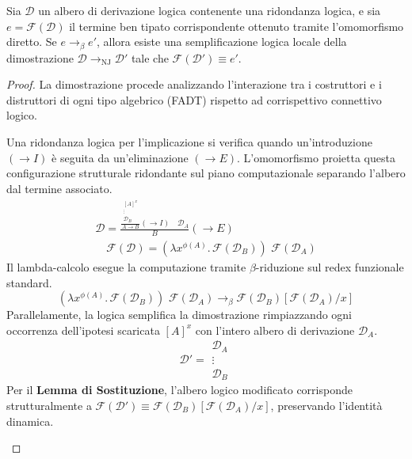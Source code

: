 \begin{thm}
    Sia $\mathcal{D}$ un albero di derivazione logica contenente una ridondanza logica, e sia $e = \mathcal{F}(\mathcal{D})$ il termine ben tipato corrispondente ottenuto 
    tramite l'omomorfismo diretto. Se $e \to_\beta e'$, allora esiste una semplificazione logica locale della dimostrazione $\mathcal{D} \to_{\text{NJ}} \mathcal{D}'$ tale 
    che $\mathcal{F}(\mathcal{D}') \equiv e'$.
\end{thm}
\begin{proof}
    La dimostrazione procede analizzando l'interazione tra i costruttori e i distruttori di ogni tipo algebrico (FADT) rispetto ad corrispettivo connettivo logico.
    \begin{description}[leftmargin=1.5em, style=nextline, font=\bfseries]
        \item[Frammento Implicativo ($\to$)]
            Una ridondanza logica per l'implicazione si verifica quando un'introduzione $(\to I)$ è seguita da un'eliminazione $(\to E)$. L'omomorfismo proietta questa 
            configurazione strutturale ridondante sul piano computazionale separando l'albero dal termine associato.
            \begin{gather*}
                \mathcal{D} = \frac{\frac{\begin{array}{c} [A]^x \\ \vdots \\ \mathcal{D}_B \end{array}}{A \to B} (\to I) \quad \mathcal{D}_A}{B} (\to E) \\[10pt]
                \quad \mathcal{F}(\mathcal{D}) = (\lambda x^{\phi(A)}. \, \mathcal{F}(\mathcal{D}_B)) \,\, \mathcal{F}(\mathcal{D}_A)
            \end{gather*}
            Il lambda-calcolo esegue la computazione tramite $\beta$-riduzione sul redex funzionale standard.
            $$ (\lambda x^{\phi(A)}. \, \mathcal{F}(\mathcal{D}_B)) \,\, \mathcal{F}(\mathcal{D}_A) \to_\beta \mathcal{F}(\mathcal{D}_B)[\mathcal{F}(\mathcal{D}_A)/x] $$
            Parallelamente, la logica semplifica la dimostrazione rimpiazzando ogni occorrenza dell'ipotesi scaricata $[A]^x$ con l'intero albero di derivazione $\mathcal{D}_A$.
            $$ \mathcal{D}' = \begin{array}{c} \mathcal{D}_A \\ \vdots \\ \mathcal{D}_B \end{array} $$
            Per il \textbf{Lemma di Sostituzione}, l'albero logico modificato corrisponde strutturalmente a 
            $\mathcal{F}(\mathcal{D}') \equiv \mathcal{F}(\mathcal{D}_B)[\mathcal{F}(\mathcal{D}_A)/x]$, 
            preservando l'identità dinamica.


\end{description}
\end{proof}
